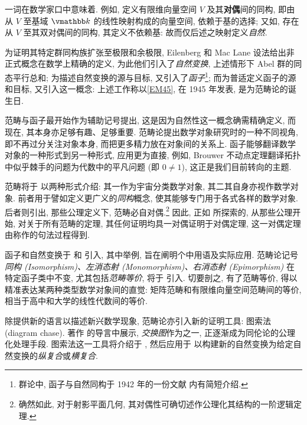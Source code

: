 \par {}一词在数学家口中意味着. 例如, 定义有限维向量空间 \(V\) 及其\textbf{对偶}间的同构, 即由从 \(V\) 至基域 \(\vmathbb k\) 的线性映射构成的向量空间, 依赖于基的选择; 又如, 存在从 \(V\) 至其双对偶间的同构, 其定义不依赖基: 故而仅后述之映射定义\textit{自然}.
\par 为证明其特定群同构族扩张至极限和余极限, Eilenberg 和 Mac Lane 设法给出非正式概念在数学上精确的定义, 为此他们引入了\textit{自然变换}, 上述情形下 Abel 群的同态平行总和; 为描述自然变换的源与目标, 又引入了\textit{函子}\footnote{群论中, 函子与自然同构于 1942 年的一份文献 \cite{EM42b} 内有简短介绍.}; 而为普适定义函子的源和目标, 又引入这一概念: 上述工作称以\ref{EM45}, 在 1945 年发表, 是为范畴论的诞生日.
\par 范畴与函子最开始作为辅助记号提出, 这是因为自然性这一概念确需精确定义, 而现在, 其本身亦足够有趣、足够重要. 范畴论提出数学对象研究时的一种不同视角, 即不再过分关注对象本身, 而把更多精力放在对象间的关系上. 函子能够翻译数学对象的一种形式到另一种形式, 应用更为直接, 例如, Brouwer 不动点定理翻译拓扑中似乎棘手的问题为代数中的平凡问题 (即 \(0\ne1\)), 这正是我们目前转向的主题.
\par 范畴将于  以两种形式介绍: 其一作为宇宙分类数学对象, 其二其自身亦视作数学对象. 前者用于譬如定义更广义的\textit{同构}概念, 使其能够专门用于各式各样的数学对象. 后者则引出, 那些公理定义下, 范畴必自对偶.\footnote{确然如此, 对于射影平面几何, 其对偶性可确切述作公理化其结构的一阶逻辑定理.} 因此, 正如  所探索的, 从那些公理开始, 对关于所有范畴的定理, 其任何证明均具一对偶证明于对偶定理, 这一对偶定理由称作的句法过程得到.
\par 函子和自然变换于  和  引入, 其中举例, 旨在阐明个中用语及实际应用. 范畴论记号\textit{同构 (Isomorphism)、左消态射 (Monomorphism)、右消态射 (Epimorphism)} 在特定函子类中不变, 尤其包括\textit{范畴等价}, 将于  引入. 切要剖之, 有了范畴等价, 得以精准表达某两种类型数学对象间的直觉: 矩阵范畴和有限维向量空间范畴间的等价, 相当于高中和大学的线性代数间的等价.
\par 除提供新的语言以描述新兴数学现象, 范畴论亦引入新的证明工具: 图索法 (diagram chase). 著作 \cite{ES52} 的导言中展示, \textit{交换图}作为之一, 正逐渐成为同伦论的公理化处理手段. 图索法这一工具将介绍于 , 然后应用于  以构建新的自然变换为给定自然变换的\textit{纵复合}或\textit{横复合}.

